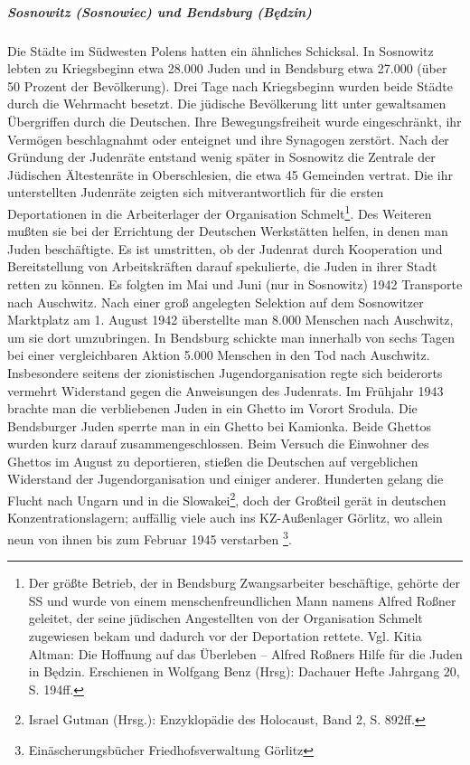 \subparagraph{Sosnowitz (Sosnowiec) und Bendsburg (Będzin)} Die Städte im Südwesten Polens hatten ein ähnliches Schicksal. In Sosnowitz lebten zu Kriegsbeginn etwa 28.000 Juden und in Bendsburg etwa 27.000 (über 50 Prozent der Bevölkerung). Drei Tage nach Kriegsbeginn wurden beide Städte durch die Wehrmacht besetzt. Die jüdische Bevölkerung litt unter gewaltsamen Übergriffen durch die Deutschen. Ihre Bewegungsfreiheit wurde eingeschränkt, ihr Vermögen beschlagnahmt oder enteignet und ihre Synagogen zerstört. Nach der Gründung der Judenräte entstand wenig später in Sosnowitz die \glqq Zentrale der Jüdischen Ältestenräte in Oberschlesien\grqq, die etwa 45 Gemeinden vertrat. Die ihr unterstellten Judenräte zeigten sich mitverantwortlich für die ersten Deportationen in die Arbeiterlager der Organisation Schmelt\footnote{Der größte Betrieb, der in Bendsburg Zwangsarbeiter beschäftige, gehörte der SS und wurde von einem menschenfreundlichen Mann namens Alfred Roßner geleitet, der seine jüdischen Angestellten von der Organisation Schmelt zugewiesen bekam und dadurch vor der Deportation rettete. Vgl. Kitia Altman: Die Hoffnung auf das Überleben -- Alfred Roßners Hilfe für die Juden in Będzin. Erschienen in Wolfgang Benz (Hrsg): Dachauer Hefte Jahrgang 20, S. 194ff.}. Des Weiteren mußten sie bei der Errichtung der Deutschen Werkstätten helfen, in denen man Juden beschäftigte. Es ist umstritten, ob der Judenrat durch Kooperation und Bereitstellung von Arbeitskräften darauf spekulierte, die Juden in ihrer Stadt retten zu können. Es folgten im Mai und Juni (nur in Sosnowitz) 1942 Transporte nach Auschwitz. Nach einer groß angelegten Selektion auf dem Sosnowitzer Marktplatz am 1. August 1942 überstellte man 8.000 Menschen nach Auschwitz, um sie dort umzubringen. In Bendsburg schickte man innerhalb von sechs Tagen bei einer vergleichbaren Aktion 5.000 Menschen in den Tod nach Auschwitz. Insbesondere seitens der zionistischen Jugendorganisation regte sich beiderorts vermehrt Widerstand gegen die Anweisungen des Judenrats. Im Frühjahr 1943 brachte man die verbliebenen Juden in ein Ghetto im Vorort Srodula. Die Bendsburger Juden sperrte man in ein Ghetto bei Kamionka. Beide Ghettos wurden kurz darauf zusammengeschlossen. Beim Versuch die Einwohner des Ghettos im August zu deportieren, stießen die Deutschen auf vergeblichen Widerstand der Jugendorganisation und einiger anderer. Hunderten gelang die Flucht nach Ungarn und in die Slowakei\footnote{Israel Gutman (Hrsg.): Enzyklopädie des Holocaust, Band 2, S. 892ff.}, doch der Großteil gerät in deutschen Konzentrationslagern; auffällig viele auch ins KZ-Außenlager Görlitz, wo allein neun von ihnen bis zum Februar 1945 verstarben \footnote{Einäscherungsbücher Friedhofsverwaltung Görlitz}.

